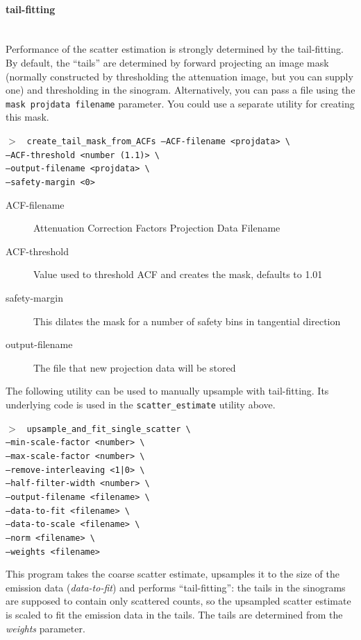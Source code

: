 \documentclass{article}
\newcommand{\subsubsubsection}[1]{\paragraph{#1}\mbox{} \\}
\newcommand{\cmdline}[1]{\par \noindent $>$ \texttt{#1}\par}
\begin{document}
\subsubsubsection{tail-fitting}
Performance of the scatter estimation is strongly determined by the tail-fitting. By default, the
``tails'' are determined by forward projecting an image mask (normally constructed by thresholding the
attenuation image, but you can supply one) and thresholding in the sinogram.
Alternatively, you can pass a file
using the \texttt{mask projdata filename} parameter. You could  use
a separate utility for creating this mask.
\cmdline{%
create\_tail\_mask\_from\_ACFs		--ACF-filename <projdata> \textbackslash \\
					--ACF-threshold <number (1.1)> \textbackslash \\
					--output-filename <projdata> \textbackslash \\
					--safety-margin <0>%
}
\begin{description}
\item[ACF-filename] Attenuation Correction Factors Projection Data Filename
\item[ACF-threshold] Value used to threshold ACF and creates the mask, defaults to 1.01
\item[safety-margin] This dilates the mask for a number of safety bins in tangential direction
\item[output-filename] The file that new projection data will be stored
\end{description}

The following utility can be used to manually upsample with tail-fitting. Its underlying code is used in
the \texttt{scatter\_estimate} utility above.

\cmdline{%
upsample\_and\_fit\_single\_scatter \textbackslash \\
					--min-scale-factor <number> \textbackslash \\
					--max-scale-factor <number> \textbackslash \\
					--remove-interleaving <1|0> \textbackslash \\
					--half-filter-width <number> \textbackslash \\
					--output-filename <filename> \textbackslash \\
					--data-to-fit <filename> \textbackslash \\
					--data-to-scale <filename> \textbackslash \\
					--norm <filename> \textbackslash \\
					--weights <filename>%
}
This program takes the coarse scatter estimate, upsamples it to the size of the emission data (\textit{data-to-fit}) and 
performs ``tail-fitting'': the tails in the sinograms are supposed to contain only scattered counts, so the upsampled
scatter estimate is scaled to fit the emission data in the tails. The tails are determined from the \textit{weights}
parameter.
\end{document}
